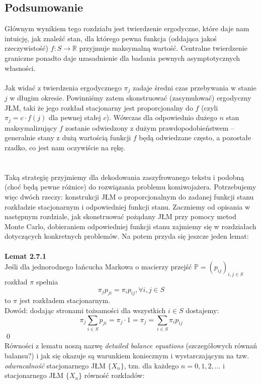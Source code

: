 \documentclass[a4paper]{article}
\begin{document}
\subsection{Podsumowanie}
Głównym wynikiem tego rozdziału jest twierdzenie ergodyczne, które daje nam intuicję, jak znaleźć stan, dla którego pewna funkcja (oddająca jakoś rzeczywistość) $f: S \rightarrow \mathbb{R}$ przyjmuje maksymalną wartość. Centralne twierdzenie graniczne ponadto daje uzasadnienie dla badania pewnych asymptotycznych własności.\\\\
Jak widać z twierdzenia ergodycznego $\pi_j$ zadaje średni czas przebywania w stanie $j$ w długim okresie. Powinniśmy zatem skonstruować (zasymulować) ergodyczny JŁM, taki że jego rozkład stacjonarny jest proporcjonalny do $f$ (czyli $\pi_j = c \cdot f(j)$ dla pewnej stałej $c$). Wówczas dla odpowiednio dużego $n$ stan maksymalizujący $f$ zostanie odwiedzony z dużym prawdopodobieństwem – generalnie stany z dużą wartością funkcji $f$ będą odwiedzane często, a pozostałe rzadko, co jest nam oczywiście na rękę.
\\\\
\\Taką strategię przyjmiemy dla dekodowania zaszyfrowanego tekstu i podobną (choć będą pewne różnice) do rozwiązania problemu komiwojażera.
Potrzebujemy więc dwóch rzeczy: konstrukcji JŁM o proporcjonalnym do zadanej funkcji stanu rozkładzie stacjonarnym i odpowiedniej funkcji stanu. Zaczniemy od opisania w następnym rozdziale, jak skonstruować pożądany JŁM przy pomocy metod Monte Carlo, dobieraniem odpowiedniej funkcji stanu zajmiemy się w rozdziałach dotyczących konkretnych problemów. Na potem przyda się jeszcze jeden lemat:
\\\\
\textbf{Lemat 2.7.1}\\
Jeśli dla jednorodnego łańcucha Markowa o macierzy przejść $\mathbb{P} = (p_{ij})_{i, j \in S}$ rozkład $\pi$ spełnia $$\pi_j p_{ji} = \pi_i p_{ij},  \forall i,j \in S$$ to $\pi$ jest rozkładem stacjonarnym.\\
Dowód: dodając stronami  tożsamości dla wszystkich $i \in S$ dostajemy:
$$\pi_j \sum\limits_{i \in S} p_{ji} = \pi_j \cdot 1 = \pi_j = \sum\limits_{i \in S} \pi_i p_{ij}$$ \qed\\
Równości z lematu noszą nazwę \textit{detailed balance equations} (szczegółowych równań balansu?) i jak się okazuje są warunkiem koniecznym i wystarczającym na tzw. \textit{odwracalność} stacjonarnego JŁM $\{X_n\}$, tzn. dla każdego $n = 0,1,2,...$ i stacjonarnego JŁM $\{X_n\}$ równość rozkładów:
\end{document}
